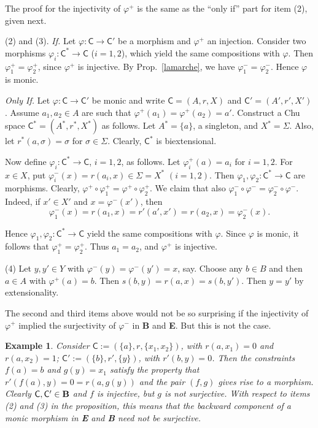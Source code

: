 \documentclass{LMCS}
\let\epf\endproof
\newtheorem{ex}[thm]{Example}
\begin{document}
The proof for the injectivity of $\varphi^+$ is the same as the ``only
if'' part for item (2), given next. 

(2) and (3).  \emph{If.} Let $\varphi : \mathsf{C}\to \mathsf{C}'$ be a morphism
and $\varphi^+$ an injection.  Consider two morphisms $\varphi_i :
\mathsf{C}^* \to \mathsf{C}$ ($i = 1,2$), which yield the same compositions
with $\varphi$.  Then $\varphi_1^+ = \varphi_2^+$, since $\varphi^+$
is injective.  By Prop.~\ref{lamarche}, we have $\varphi_1^- =
\varphi_2^-$.  Hence $\varphi$ is monic. 

\emph{Only If.} Let  $\varphi : \mathsf{C}\to \mathsf{C}'$  be monic and
write  $\mathsf{C} = (A,r,X )$ and  $\mathsf{C}' = (A',r',X')$. 
Assume  $a_1,a_2 \in A$  are such that  $\varphi^+ (a_1) = \varphi^+(a_2) = a'$. 
Construct a Chu space $\mathsf{C}^* = (A^*,r^*, X^*)$ as follows. 
Let  $A^* = \{a\}$, a singleton, and  $X^* = \Sigma$. 
Also, let  $r^*(a, \sigma )=\sigma$ for $\sigma \in \Sigma$. Clearly, $\mathsf{C}^*$  is biextensional. 

Now define $\varphi_i : \mathsf{C}^* \to \mathsf{C}$, $i = 1,2$, as follows. 
Let $\varphi^+_i(a) = a_i$ for $i = 1,2$.  For $x \in X$, put
$\varphi^-_i(x) = r(a_i, x) \in \Sigma = X^*$ $(i=1,2)$.  Then
$\varphi_1, \varphi_2 : \mathsf{C}^* \to \mathsf{C}$ are morphisms. 
Clearly, $\varphi^+ \circ \varphi^+_1 = \varphi^+ \circ \varphi^+_2$. 
We claim that also $\varphi^-_1 \circ \varphi^- = \varphi^-_2 \circ
\varphi^-$. Indeed, if $x' \in X'$ and $x = \varphi^-(x')$, then
$$
\varphi^-_1(x) = r(a_1,x) = r'(a', x')=r(a_2, x)= \varphi^-_2(x). 
$$

Hence  $\varphi_1, \varphi_2 : \mathsf{C}^* \to \mathsf{C}$
yield the same compositions with  $\varphi$. 
Since  $\varphi$  is monic, it follows that  $\varphi^+_1 = \varphi^+_2$. 
Thus  $a_1 = a_2$, and  $\varphi^+$  is injective. 

(4) Let $y,y' \in Y$ with $\varphi^-(y) = \varphi^-(y') = x$, say. Choose
any $b \in B$ and then $a \in A$ with $\varphi^+(a) =b$. Then
$s(b,y) = r(a,x) = s(b,y')$. Then $y=y'$ by extensionality.  \epf

The second and third items above would not be so surprising
  if the injectivity of $\varphi^+$ implied the surjectivity of
  $\varphi^-$ in {\bf B} and {\bf E}.  But this is not the case.

  \begin{ex} Consider $\mathsf{C}:= (\{ a \}, r, \{x_1, x_2\})$, with
  $r(a, x_1) =0$ and $r(a, x_2)=1$; $\mathsf{C}':= (\{ b \}, r', \{ y
  \})$, with $r'(b, y) =0$. Then the constraints $f(a) = b$ and $g(y)
  = x_1$ satisfy the property that $r'(f(a), y)= 0 = r(a,g(y))$ and
  the pair $(f,g)$ gives rise to a morphism. Clearly $\mathsf{C}, {\sf
  C'} \in {\bf B}$ and $f$ is injective, but $g$ is not surjective.
  With respect to items (2) and (3) in the proposition, this means
  that the backward component of a monic morphism in {\bf E} and {\bf
  B} need not be surjective.
\end{ex}
\end{document}
